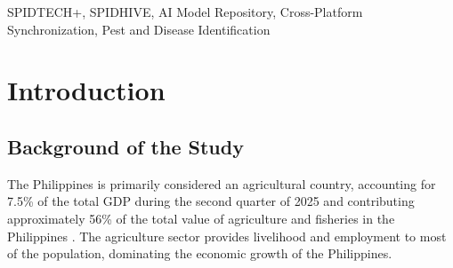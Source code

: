 \documentclass[journal]{./IEEE/IEEEtran}
\title{\SPTITLE}
\author{\ADVISEE~and~\ADVISER%
\REMARK
}
\begin{document}
\maketitle

\begin{abstract}
The effective monitoring of crop pests and diseases is critical for agricultural sustainability in the Philippines. While applications like SPIDTECH+ facilitate remote diagnostics, the underlying infrastructure previously lacked a centralized mechanism for managing the iterative development of the machine learning models themselves. This study developed an AI Model Zoo integrated within the SPIDHIVE platform to streamline the storage, management, and deployment of agricultural AI models. A robust, bidirectional cross-platform architecture was engineered utilizing Supabase as a dedicated mobile backend. This integration enables the efficient downstream, over-the-air delivery of compiled \texttt{.tflite} models to the SPIDTECH+ client, while simultaneously facilitating the upstream mirroring of images for expert review. The web platform further optimizes developer workflows through automated artifact parsing, robust dataset tracking, and automated configuration generation to prevent class confusion during model retraining. System evaluation by AI Developers yielded an "Excellent" System Usability Scale (SUS) score of 88.0, confirming high functional efficiency and minimal cognitive load. Ultimately, this localized repository establishes a continuous improvement pipeline for agricultural AI, providing researchers with the necessary infrastructure to accelerate the deployment of accurate diagnostic tools for crop protection.
\end{abstract}

\begin{keywords}
SPIDTECH+, SPIDHIVE, AI Model Repository, Cross-Platform Synchronization, Pest and Disease Identification
\end{keywords}

\section{Introduction}
\subsection{Background of the Study}
The Philippines is primarily considered an agricultural country, accounting for 7.5\% of the total GDP during the second quarter of 2025 and contributing approximately 56\% of the total value of agriculture and fisheries in the Philippines \cite{psa-2025}. The agriculture sector provides livelihood and employment to most of the population, dominating the economic growth of the Philippines\cite{dogello-2021}.
\end{document}
